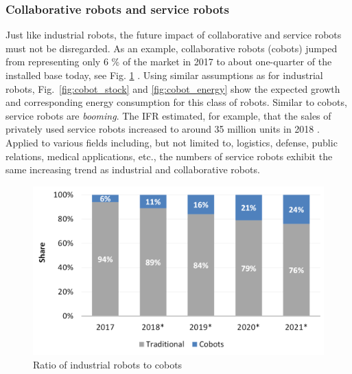 \subsubsection{Collaborative robots and service robots}
Just like industrial robots, the future impact of collaborative and service robots must not be disregarded. As an example, collaborative robots (cobots) jumped from representing only 6 \% of the market in 2017 to about one-quarter of the installed base today, see Fig. \ref{fig:industrial_cobot_share} \cite{tobe2015}. Using similar assumptions as for industrial robots, Fig.~\ref{fig:cobot_stock} and \ref{fig:cobot_energy} show the expected growth and corresponding energy consumption for this class of robots. Similar to cobots, service robots are \textit{booming}. The IFR estimated, for example, that the sales of privately used service robots increased to around 35 million units in 2018 \cite{IFR2015}. Applied to various fields including, but not limited to, logistics, defense, public relations, medical applications, etc., the numbers of service robots exhibit the same increasing trend as industrial and collaborative robots.
\begin{figure}[!t]
	\centering
	\includegraphics[width= 0.9\columnwidth]{fig/share_industrial_and_cobots} 
	\caption{Ratio of industrial robots to cobots \cite{statista_ir_cobot_share}}
	\label{fig:industrial_cobot_share}
\end{figure}
